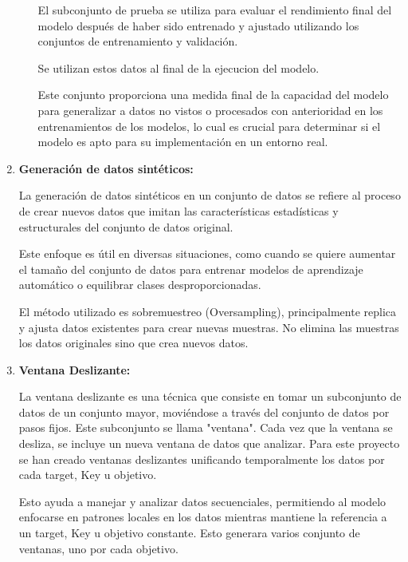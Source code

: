 \begin{enumerate}
\begin{itemize}
	El subconjunto de prueba se utiliza para evaluar el rendimiento final del modelo después de haber sido entrenado y ajustado utilizando los conjuntos de entrenamiento y validación. 
	
	Se utilizan estos datos al final de la ejecucion del modelo.
	
	Este conjunto proporciona una medida final de la capacidad del modelo para generalizar a datos no vistos o procesados con anterioridad en los entrenamientos de los modelos, lo cual es crucial para determinar si el modelo es apto para su implementación en un entorno real.
	
\end{itemize}


\item
\textbf{Generación de datos sintéticos:}

	La generación de datos sintéticos en un conjunto de datos se refiere al proceso de crear nuevos datos que imitan las características estadísticas y estructurales del conjunto de datos original. 
	
	Este enfoque es útil en diversas situaciones, como cuando se quiere aumentar el tamaño del conjunto de datos para entrenar modelos de aprendizaje automático o equilibrar clases desproporcionadas.
	
	El método utilizado es sobremuestreo (Oversampling), principalmente replica y ajusta datos existentes para crear nuevas muestras. No elimina las muestras los datos originales sino que crea nuevos datos.
	
	
\item
\textbf{Ventana Deslizante:}

	
La ventana deslizante es una técnica que consiste en tomar un subconjunto de datos de un conjunto mayor, moviéndose a través del conjunto de datos por pasos fijos. Este subconjunto se llama "ventana". Cada vez que la ventana se desliza, se incluye un nueva ventana de datos que analizar. Para este proyecto se han creado ventanas deslizantes unificando temporalmente los datos por cada target, Key u objetivo.

Esto ayuda a manejar y analizar datos secuenciales, permitiendo al modelo enfocarse en patrones locales en los datos mientras mantiene la referencia a un target, Key u objetivo constante. Esto generara varios conjunto de ventanas, uno por cada objetivo.


	
	
\end{enumerate}


